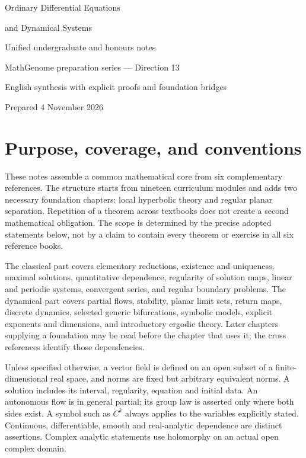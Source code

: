 \documentclass[11pt,oneside]{book}
\theoremstyle{definition}
\theoremstyle{remark}\newtheorem{remark}[theorem]{Remark}
\begin{document}
\frontmatter

\begin{titlepage}
\centering
\vspace*{25mm}
{\Huge Ordinary Differential Equations\par}
\vspace{4mm}
{\Huge and Dynamical Systems\par}
\vspace{12mm}
{\Large Unified undergraduate and honours notes\par}
\vspace{12mm}
{\large MathGenome preparation series --- Direction 13\par}
\vfill
{\large English synthesis with explicit proofs and foundation bridges\par}
\vspace{6mm}
{\large Prepared 4 November 2026\par}
\end{titlepage}

\chapter*{Purpose, coverage, and conventions}
These notes assemble a common mathematical core from six complementary
references. The structure starts from nineteen curriculum modules and adds
two necessary foundation chapters: local hyperbolic theory and regular planar
separation. Repetition of a theorem across textbooks does not create a second
mathematical obligation. The scope is determined by the precise adopted
statements below, not by a claim to contain every theorem or exercise in all
six reference books.

The classical part covers elementary reductions, existence and uniqueness,
maximal solutions, quantitative dependence, regularity of solution maps,
linear and periodic systems, convergent series, and regular boundary problems.
The dynamical part covers partial flows, stability, planar limit sets, return
maps, discrete dynamics, selected generic bifurcations, symbolic models,
explicit exponents and dimensions, and introductory ergodic theory.
Later chapters supplying a foundation may be read before the chapter that
uses it; the cross references identify those dependencies.

Unless specified otherwise, a vector field is defined on an open subset of a
finite-dimensional real space, and norms are fixed but arbitrary equivalent
norms. A solution includes its interval, regularity, equation and initial data.
An autonomous flow is in general partial; its group law is asserted only
where both sides exist. A symbol such as $C^k$ always applies to the variables
explicitly stated. Continuous, differentiable, smooth and real-analytic
dependence are distinct assertions. Complex analytic statements use
holomorphy on an actual open complex domain.
\end{document}
